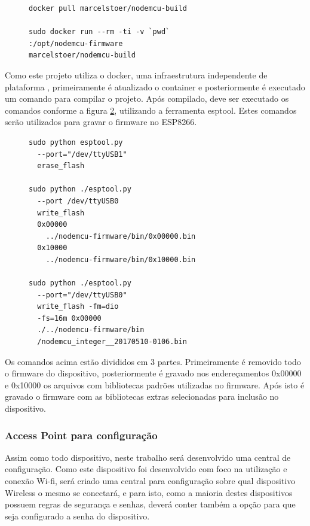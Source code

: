 \documentclass[journal]{IEEEtran}
\begin{document}
\begin{figure}[h]
\centering

\begin{verbatim}
docker pull marcelstoer/nodemcu-build

sudo docker run --rm -ti -v `pwd`
:/opt/nodemcu-firmware 
marcelstoer/nodemcu-build
\end{verbatim}

\label{alg:dockerpull}
\end{figure}

Como este projeto utiliza o docker, uma infraestrutura independente de plataforma \cite{dockeroque}, primeiramente é atualizado o container e posteriormente é executado um comando para compilar o projeto. 
Após compilado, deve ser executado os comandos conforme a figura \ref{alg:esptool1}, utilizando a ferramenta esptool. Estes comandos serão utilizados para gravar o firmware no ESP8266. 

\begin{figure}[h]
\centering

\begin{verbatim}
sudo python esptool.py 
  --port="/dev/ttyUSB1" 
  erase_flash

sudo python ./esptool.py 
  --port /dev/ttyUSB0 
  write_flash 
  0x00000 
    ../nodemcu-firmware/bin/0x00000.bin 
  0x10000 
    ../nodemcu-firmware/bin/0x10000.bin

sudo python ./esptool.py 
  --port="/dev/ttyUSB0" 
  write_flash -fm=dio 
  -fs=16m 0x00000 
  ./../nodemcu-firmware/bin
  /nodemcu_integer__20170510-0106.bin
\end{verbatim}

\label{alg:esptool1}
\end{figure}

Os comandos acima estão divididos em 3 partes. Primeiramente é removido todo o firmware do dispositivo, posteriormente é gravado nos endereçamentos 0x00000 e 0x10000 os arquivos com bibliotecas padrões utilizadas no firmware. Após isto é gravado o firmware com as bibliotecas extras selecionadas para inclusão no dispositivo.

\subsubsection{Access Point para configuração}

Assim como todo dispositivo, neste trabalho será desenvolvido uma central de configuração. Como este dispositivo foi desenvolvido com foco na utilização e conexão Wi-fi, será criado uma central para configuração sobre qual dispositivo Wireless o mesmo se conectará, e para isto, como a maioria destes dispositivos possuem regras de segurança e senhas, deverá conter também a opção para que seja configurado a senha do dispositivo. 
\end{document}
